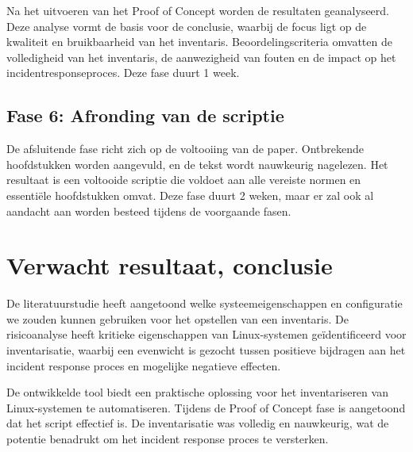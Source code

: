 Na het uitvoeren van het Proof of Concept worden de resultaten geanalyseerd.
Deze analyse vormt de basis voor de conclusie, waarbij de focus ligt op de kwaliteit en bruikbaarheid van het inventaris.
Beoordelingscriteria omvatten de volledigheid van het inventaris, de aanwezigheid van fouten en de impact op het incidentresponseproces.
Deze fase duurt 1 week.

\subsection{Fase 6: Afronding van de scriptie}%
\label{sub:afronding_van_de_scriptie}

De afsluitende fase richt zich op de voltooiing van de paper.
Ontbrekende hoofdstukken worden aangevuld, en de tekst wordt nauwkeurig nagelezen.
Het resultaat is een voltooide scriptie die voldoet aan alle vereiste normen en essenti\"ele hoofdstukken omvat.
Deze fase duurt 2 weken, maar er zal ook al aandacht aan worden besteed tijdens de voorgaande fasen.

\section{Verwacht resultaat, conclusie}%
\label{sec:verwachte_resultaten}

De literatuurstudie heeft aangetoond welke systeemeigenschappen en configuratie we zouden kunnen gebruiken voor het opstellen van een inventaris.
De risicoanalyse heeft kritieke eigenschappen van Linux-systemen ge\"identificeerd voor inventarisatie, waarbij een evenwicht is gezocht tussen positieve bijdragen aan het incident response proces en mogelijke negatieve effecten.

De ontwikkelde tool biedt een praktische oplossing voor het inventariseren van Linux-systemen te automatiseren.
Tijdens de Proof of Concept fase is aangetoond dat het script effectief is.
De inventarisatie was volledig en nauwkeurig, wat de potentie benadrukt om het incident response proces te versterken.

